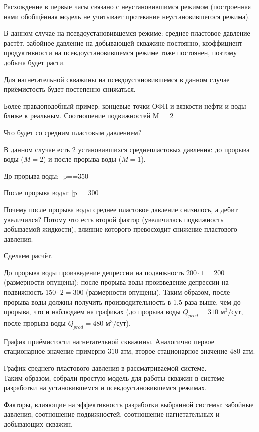 \documentclass[main.tex]{subfiles}
\begin{document}
Расхождение в первые часы связано с неустановившимся режимом (построенная нами обобщённая модель не учитывает протекание неустановившегося режима).

В данном случае на псевдоустановившемся режиме: среднее пластовое давление растёт, забойное давление на добывающей скважине постоянно, коэффициент продуктивности на псевдоустановившемся режиме тоже постоянен, поэтому добыча будет расти.


Для нагнетательной скважины на псевдоустановившемся в данном случае приёмистость будет постепенно снижаться.


Более правдоподобный пример: концевые точки ОФП и вязкости нефти и воды ближе к реальным. Соотношение подвижностей
\beq
M==2
\eeq

Что будет со средним пластовым давлением?

В данном случае есть 2 установившихся среднепластовых давления: до прорыва воды ($M=2$) и после прорыва воды ($M=1$).

До прорыва воды:
\beq
\bar{p}==350
\eeq

После прорыва воды:
\beq
\bar{p}==300
\eeq

Почему после прорыва воды среднее пластовое давление снизилось, а дебит увеличился? Потому что есть второй фактор (увеличилась подвижность добываемой жидкости), влияние которого превосходит снижение пластового давления.

Сделаем расчёт.

До прорыва воды произведение депрессии на подвижность $200\cdot1=200$ (размерности опущены); после прорыва воды произведение депрессии на подвижность $150\cdot2=300$ (размерности опущены). Таким образом, после прорыва воды должны получить производительность в 1.5 раза выше, чем до прорыва, что и наблюдаем на графиках (до прорыва воды $Q_{prod}=310\text{ м}^3\text{/сут}$, после прорыва воды $Q_{prod}=480\text{ м}^3\text{/сут}$).


График приёмистости нагнетательной скважины. Аналогично первое стационарное значение примерно $310$ атм, второе стационарное значение $480$ атм.


График среднего пластового давления в рассматриваемой системе.\\

Таким образом, собрали простую модель для работы скважин в системе разработки на установившемся и псевдоустановившемся режимах.

Факторы, влияющие на эффективность разработки выбранной системы: забойные давления, соотношение подвижностей, соотношение нагнетательных и добывающих скважин.
\end{document}
